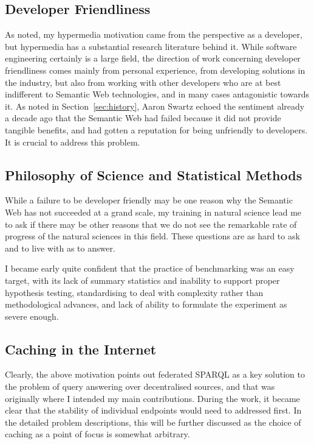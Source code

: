 \subsection{Developer Friendliness}

As noted, my hypermedia motivation came from the perspective as a
developer, but hypermedia has a substantial research literature behind
it. While software engineering certainly is a large field, the
direction of work concerning developer friendliness comes mainly from
personal experience, from developing solutions in the industry, but
also from working with other developers who are at best indifferent to
Semantic Web technologies, and in many cases antagonistic towards it. 
As noted in Section~\ref{sec:history}, Aaron Swartz echoed the
sentiment already a decade ago that the Semantic Web had failed
because it did not provide tangible benefits, and had gotten a
reputation for being unfriendly to developers. It is crucial to
address this problem.


\subsection{Philosophy of Science and Statistical Methods}

While a failure to be developer friendly may be one reason why the
Semantic Web has not succeeded at a grand scale, my training in
natural science lead me to ask if there may be other reasons that we
do not see the remarkable rate of progress of the natural sciences in
this field. These questions are as hard to ask and to live with as to
answer. 

I became early quite confident that the practice of benchmarking was
an easy target, with its lack of summary statistics and inability to
support proper hypothesis testing, standardising to deal with
complexity rather than methodological advances, and lack of ability to
formulate the experiment as severe enough.

\subsection{Caching in the Internet}\label{sec:motivcache}

Clearly, the above motivation points out federated SPARQL as a key
solution to the problem of query answering over decentralised sources,
and that was originally where I intended my main contributions. During
the work, it became clear that the stability of individual endpoints
would need to addressed first. In the detailed problem descriptions,
this will be further discussed as the choice of caching as a point of
focus is somewhat arbitrary.

